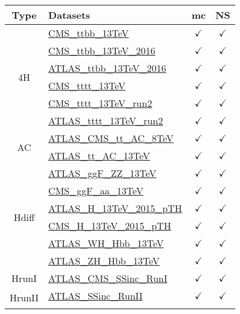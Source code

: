 \documentclass{article}
\begin{document}
\begin{table}[H]
\footnotesize
\centering
\begin{tabular}{|c|l|c|c|}
\hline
 Type & Datasets  & mc & NS \\ \hline
\multirow{6}{*}{4H}
 & \href{https://arxiv.org/abs/1705.10141}{CMS_ttbb_13TeV}  & $\checkmark$ & $\checkmark$\\ \cline{2-4}
 & \href{https://arxiv.org/abs/1909.05306}{CMS_ttbb_13TeV_2016}  & $\checkmark$ & $\checkmark$\\ \cline{2-4}
 & \href{https://arxiv.org/abs/1811.12113}{ATLAS_ttbb_13TeV_2016}  & $\checkmark$ & $\checkmark$\\ \cline{2-4}
 & \href{https://arxiv.org/abs/1710.10614}{CMS_tttt_13TeV}  & $\checkmark$ & $\checkmark$\\ \cline{2-4}
 & \href{https://arxiv.org/abs/1908.06463}{CMS_tttt_13TeV_run2}  & $\checkmark$ & $\checkmark$\\ \cline{2-4}
 & \href{https://arxiv.org/abs/2007.14858}{ATLAS_tttt_13TeV_run2}  & $\checkmark$ & $\checkmark$
\\ \hline
\multirow{2}{*}{AC}
 & \href{https://arxiv.org/abs/1709.05327}{ATLAS_CMS_tt_AC_8TeV}  & $\checkmark$ & $\checkmark$\\ \cline{2-4}
 & \href{https://cds.cern.ch/record/2682109}{ATLAS_tt_AC_13TeV}  & $\checkmark$ & $\checkmark$
\\ \hline
\multirow{6}{*}{Hdiff}
 & \href{https://arxiv.org/abs/1909.02845}{ATLAS_ggF_ZZ_13TeV}  & $\checkmark$ & $\checkmark$\\ \cline{2-4}
 & \href{https://inspirehep.net/literature/1725274}{CMS_ggF_aa_13TeV}  & $\checkmark$ & $\checkmark$\\ \cline{2-4}
 & \href{https://inspirehep.net/literature/1743896}{ATLAS_H_13TeV_2015_pTH}  & $\checkmark$ & $\checkmark$\\ \cline{2-4}
 & \href{https://arxiv.org/abs/1812.06504}{CMS_H_13TeV_2015_pTH}  & $\checkmark$ & $\checkmark$\\ \cline{2-4}
 & \href{https://arxiv.org/abs/1903.04618}{ATLAS_WH_Hbb_13TeV}  & $\checkmark$ & $\checkmark$\\ \cline{2-4}
 & \href{https://arxiv.org/abs/1903.04618}{ATLAS_ZH_Hbb_13TeV}  & $\checkmark$ & $\checkmark$
\\ \hline
\multirow{1}{*}{HrunI}
 & \href{https://arxiv.org/abs/1606.02266}{ATLAS_CMS_SSinc_RunI}  & $\checkmark$ & $\checkmark$
\\ \hline
\multirow{2}{*}{HrunII}
 & \href{https://arxiv.org/abs/1909.02845}{ATLAS_SSinc_RunII}  & $\checkmark$ & $\checkmark$\\ \cline{2-4}

\end{tabular}
\end{table}
\end{document}

